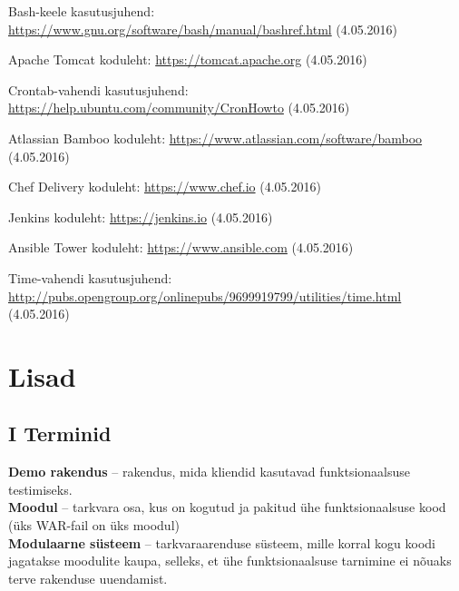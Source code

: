 \documentclass[12pt]{report}
\begin{document}
  \begin{thebibliography}{9}
    \label{kasutatud-materjalid}
  
    Bash-keele kasutusjuhend: \url{https://www.gnu.org/software/bash/manual/bashref.html} (4.05.2016)
    
    Apache Tomcat koduleht: \url{https://tomcat.apache.org} (4.05.2016)
  
    Crontab-vahendi kasutusjuhend: \url{https://help.ubuntu.com/community/CronHowto} (4.05.2016)
  
    Atlassian Bamboo koduleht: \url{https://www.atlassian.com/software/bamboo} (4.05.2016)
  
    Chef Delivery koduleht: \url{https://www.chef.io} (4.05.2016)
  
    Jenkins koduleht: \url{https://jenkins.io} (4.05.2016)
  
    Ansible Tower koduleht: \url{https://www.ansible.com} (4.05.2016)
    
    Time-vahendi kasutusjuhend: \url{http://pubs.opengroup.org/onlinepubs/9699919799/utilities/time.html} (4.05.2016)
 
  \end{thebibliography}

  \newpage
  
  \section*{Lisad}
  \label{lisad}
  
  \subsection*{I Terminid}
  \label{terms}
  
  \textbf{Demo rakendus} \--- rakendus, mida kliendid kasutavad funktsionaalsuse testimiseks.\\
  
  \textbf{Moodul} \--- tarkvara osa, kus on kogutud ja pakitud ühe funktsionaalsuse kood (üks WAR\--fail on üks moodul)\\
  
  \textbf{Modulaarne süsteem} \--- tarkvaraarenduse süsteem, mille korral kogu koodi jagatakse moodulite kaupa, selleks, et ühe funktsionaalsuse tarnimine ei nõuaks terve rakenduse uuendamist.\\
  
\end{document}
